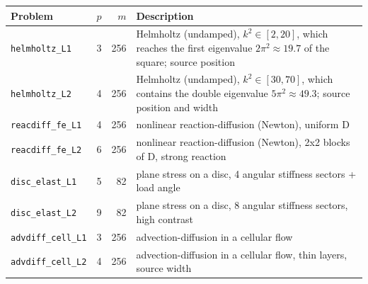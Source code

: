 \begin{tabular}{lrrp{7.2cm}}
\toprule
Problem & $p$ & $m$ & Description \\
\midrule
\texttt{helmholtz\_L1} & 3 & 256 & Helmholtz (undamped), $k^2\in[2,20]$, which reaches the first eigenvalue $2\pi^2\approx19.7$ of the square; source position \\
\texttt{helmholtz\_L2} & 4 & 256 & Helmholtz (undamped), $k^2\in[30,70]$, which contains the double eigenvalue $5\pi^2\approx49.3$; source position and width \\
\texttt{reacdiff\_fe\_L1} & 4 & 256 & nonlinear reaction-diffusion (Newton), uniform D \\
\texttt{reacdiff\_fe\_L2} & 6 & 256 & nonlinear reaction-diffusion (Newton), 2x2 blocks of D, strong reaction \\
\texttt{disc\_elast\_L1} & 5 & 82 & plane stress on a disc, 4 angular stiffness sectors + load angle \\
\texttt{disc\_elast\_L2} & 9 & 82 & plane stress on a disc, 8 angular stiffness sectors, high contrast \\
\texttt{advdiff\_cell\_L1} & 3 & 256 & advection-diffusion in a cellular flow \\
\texttt{advdiff\_cell\_L2} & 4 & 256 & advection-diffusion in a cellular flow, thin layers, source width \\
\bottomrule
\end{tabular}
